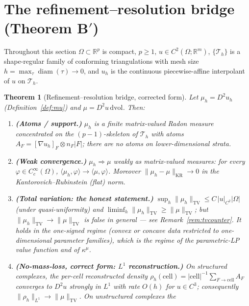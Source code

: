 \documentclass[11pt,a4paper]{article}
\theoremstyle{plain}
\newtheorem{theorem}{Theorem}[section]
\theoremstyle{definition}
\theoremstyle{remark}
\newcommand{\kmu}{\kappa^{\mu}}
\newcommand{\RR}{\mathbb{R}}
\newcommand{\TV}{\mathrm{TV}}
\newcommand{\dvol}{\,\mathrm{dvol}}
\DeclareMathOperator{\KR}{KR}
\begin{document}
\section{The refinement--resolution bridge (Theorem B$'$)}
\label{sec:theoremB}

Throughout this section $\Omega \subset \RR^p$ is compact, $p \ge 1$,
$u \in C^2(\Omega; \RR^m)$, $\{\mathcal{T}_h\}$ is a shape-regular family
of conforming triangulations with mesh size
$h = \max_\tau \operatorname{diam}(\tau) \to 0$, and $u_h$ is the
continuous piecewise-affine interpolant of $u$ on $\mathcal{T}_h$.

\begin{theorem}[Refinement--resolution bridge, corrected form]
\label{thm:Bprime}
Let $\mu_h = D^2 u_h$ (Definition~\ref{def:mu}) and
$\mu = D^2u \dvol$. Then:
\begin{enumerate}[label=(\roman*),leftmargin=2em]
\item \textbf{(Atoms / support.)} $\mu_h$ is a finite matrix-valued Radon
      measure concentrated on the $(p-1)$-skeleton of $\mathcal{T}_h$ with
      atoms $A_F = [\nabla u_h]_F \otimes n_F |F|$; there are no atoms on
      lower-dimensional strata.
\item \textbf{(Weak convergence.)} $\mu_h \Rightarrow \mu$ weakly as
      matrix-valued measures: for every
      $\varphi \in C_c^\infty(\Omega)$,
      $\langle \mu_h, \varphi \rangle \to \langle \mu, \varphi \rangle$.
      Moreover $\|\mu_h - \mu\|_{\KR} \to 0$ in the
      Kantorovich--Rubinstein (flat) norm.
\item \textbf{(Total variation: the honest statement.)}
      $\sup_h \|\mu_h\|_{\TV} \le C\,|u|_{C^2}|\Omega|$ (under
      quasi-uniformity) and
      $\liminf_h \|\mu_h\|_{\TV} \ge \|\mu\|_{\TV}$; but
      $\|\mu_h\|_{\TV} \to \|\mu\|_{\TV}$ is \emph{false in general} ---
      see Remark~\ref{rem:tvcounter}. It holds in the one-signed regime
      (convex or concave data restricted to one-dimensional parameter
      families), which is the regime of the parametric-LP value function
      and of $\kmu$.
\item \textbf{(No-mass-loss, correct form: $L^1$ reconstruction.)}
      On structured complexes, the per-cell reconstructed density
      $\rho_h(\mathrm{cell}) = |\mathrm{cell}|^{-1} \sum_{F \to
      \mathrm{cell}} A_F$ converges to $D^2 u$ \emph{strongly in $L^1$}
      with rate $O(h)$ for $u \in C^3$; consequently
      $\|\rho_h\|_{L^1} \to \|\mu\|_{\TV}$. On unstructured complexes the

\end{enumerate}
\end{theorem}
\end{document}
